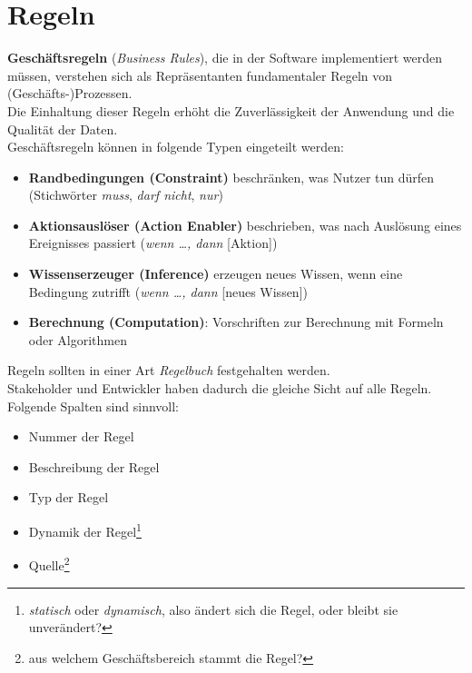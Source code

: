 \section{Regeln}
\textbf{Geschäftsregeln} (\textit{Business Rules}), die in der Software implementiert werden müssen, verstehen sich als Repräsentanten fundamentaler Regeln von (Geschäfts-)Prozessen.\\
Die Einhaltung dieser Regeln erhöht die Zuverlässigkeit der Anwendung und die Qualität der Daten.\\

\noindent
Geschäftsregeln können in folgende Typen eingeteilt werden:

\begin{itemize}
    \item \textbf{Randbedingungen (Constraint)} beschränken, was Nutzer tun dürfen (Stichwörter \textit{muss}, \textit{darf nicht}, \textit{nur})
    \item \textbf{Aktionsauslöser (Action Enabler)} beschrieben, was nach Auslösung eines Ereignisses passiert (\textit{wenn \ldots, dann} [Aktion])
    \item \textbf{Wissenserzeuger (Inference)} erzeugen neues Wissen, wenn eine Bedingung zutrifft (\textit{wenn \ldots, dann} [neues Wissen])
    \item \textbf{Berechnung (Computation)}: Vorschriften zur Berechnung mit Formeln oder Algorithmen
\end{itemize}

\noindent
Regeln sollten in einer Art \textit{Regelbuch} festgehalten werden.\\
Stakeholder und Entwickler haben dadurch die gleiche Sicht auf alle Regeln.\\
Folgende Spalten sind sinnvoll:

\begin{itemize}
    \item Nummer der Regel
    \item Beschreibung der Regel
    \item Typ der Regel
    \item Dynamik der Regel\footnote{\textit{statisch} oder \textit{dynamisch}, also ändert sich die Regel, oder bleibt sie unverändert?}
    \item Quelle\footnote{aus welchem Geschäftsbereich stammt die Regel?}
\end{itemize}